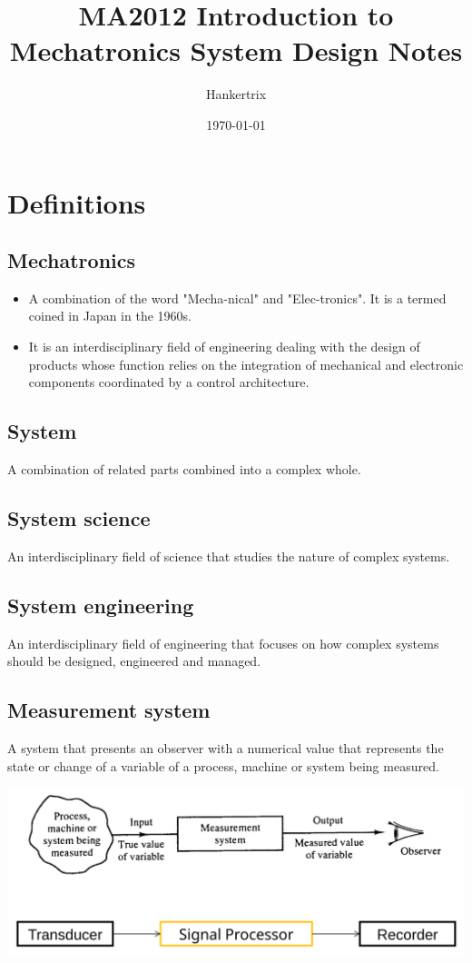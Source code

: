 \documentclass[11pt]{article}
\author{Hankertrix}
\date{\today}
\title{MA2012 Introduction to Mechatronics System Design Notes}
\begin{document}
\maketitle
\setcounter{tocdepth}{2}
\tableofcontents \clearpage\section{Definitions}
\label{sec:org6a5a441}

\subsection{Mechatronics}
\label{sec:org0a997cb}
\begin{itemize}
\item A combination of the word "Mecha-nical" and "Elec-tronics". It is a termed coined in Japan in the 1960s.
\item It is an interdisciplinary field of engineering dealing with the design of products whose function relies on the integration of mechanical and electronic components coordinated by a control architecture.
\end{itemize}
\subsection{System}
\label{sec:org11e1205}
A combination of related parts combined into a complex whole.
\subsection{System science}
\label{sec:orgfe3e36e}
An interdisciplinary field of science that studies the nature of complex systems.
\subsection{System engineering}
\label{sec:org06c68a1}
An interdisciplinary field of engineering that focuses on how complex systems should be designed, engineered and managed.
\subsection{Measurement system}
\label{sec:orgb633593}
A system that presents an observer with a numerical value that represents the state or change of a variable of a process, machine or system being measured.
\begin{center}
\includegraphics[width=.9\linewidth]{./images/measurement-system.png}
\end{center}
\end{document}
